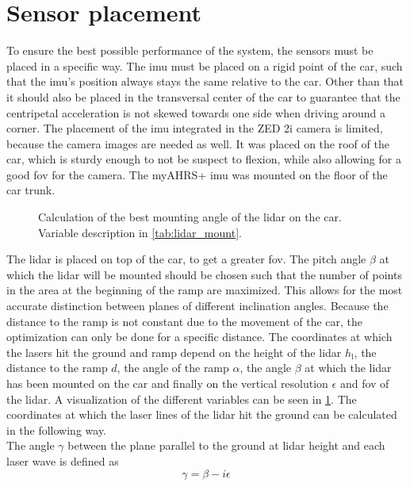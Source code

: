 \section{Sensor placement}
To ensure the best possible performance of the system, the sensors must be placed in a specific way.
The \gls{imu} must be placed on a rigid point of the car, such that the \gls{imu}'s position always stays the same relative to the car.
Other than that it should also be placed in the transversal center of the car to guarantee that the centripetal acceleration is not skewed towards one side when driving around a corner.
The placement of the \gls{imu} integrated in the ZED 2i camera is limited, because the camera images are needed as well.
It was placed on the roof of the car, which is sturdy enough to not be suspect to flexion, while also allowing for a good \gls{fov} for the camera.
The myAHRS+ \gls{imu} was mounted on the floor of the car trunk.\\
\begin{figure}[htpb]
	\centering
	
	\caption[\acrshort{lidar} placement on the car]{Calculation of the best mounting angle of the \acrshort{lidar} on the car. Variable description in \cref{tab:lidar_mount}.}
	\label{fig:tikz_lidar_mount}
\end{figure}
The \gls{lidar} is placed on top of the car, to get a greater \gls{fov}.
The pitch angle $\beta$ at which the \gls{lidar} will be mounted should be chosen such that the number of points in the area at the beginning of the ramp are maximized.
This allows for the most accurate distinction between planes of different inclination angles.
Because the distance to the ramp is not constant due to the movement of the car, the optimization can only be done for a specific distance.
The coordinates at which the lasers hit the ground and ramp depend on the height of the \gls{lidar} $h_\mathrm{l}$, the distance to the ramp $d$, the angle of the ramp $\alpha$, the angle $\beta$ at which the \gls{lidar} has been mounted on the car and finally on the vertical resolution $\epsilon$ and \gls{fov} of the \gls{lidar}.
A visualization of the different variables can be seen in \cref{fig:tikz_lidar_mount}.
The coordinates at which the laser lines of the \gls{lidar} hit the ground can be calculated in the following way.\\
The angle $\gamma$ between the plane parallel to the ground at \gls{lidar} height and each laser wave is defined as
\begin{equation}
	\gamma = \beta - i\epsilon
\end{equation}
